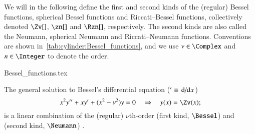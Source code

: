


\newcommand{\myemph}{\textbf}
\Zv[1][1=\nu]{\Cylindrical[#1][Z]}
\zn[1][1=n]{\Cylindrical[#1][z]}
\Rzn[1][1=n]{\Cylindrical[#1][R]}




We will in the following define the first and second kinds of the (regular) Bessel functions, spherical Bessel functions and Riccati--Bessel functions, collectively denoted $\Zv[]$, $\zn[]$ and $\Rzn[]$, respectively. The second kinds are also called the Neumann, spherical Neumann and Riccati--Neumann functions. Conventions are shown in~\cref{tab:cylinder:Bessel_functions}, and we use $\nu\in\Complex$ and $n\in\Integer$ to denote the order.


\begin{table}[h]
    {Bessel_functions.tex}
    \caption{Types of Bessel functions and conventions. Here, $\nu\in\Complex$ and $n\in \Integer$ are constants, and $x\in \Complex$ is a variable. Linear combinations of the first and second kinds are denoted in the second column. Subscripts mean order, and parenthesised superscripts refer to kind.}
    \label{tab:cylinder:Bessel_functions}
\end{table}

The general solution to Bessel's differential equation ($'\equiv \dv*{}{x}$)
\begin{equation}\label{eq:cylinder:Bessels_eq}
    x^2 y'' + x y' + (x^2 -\nu^2 )y = 0 \quad\Rightarrow\quad y(x) = \Zv(x);
\end{equation}
is a linear combination of the (regular) $\nu$th-order  (first kind, $\Bessel$) and  (second kind, $\Neumann$) .






